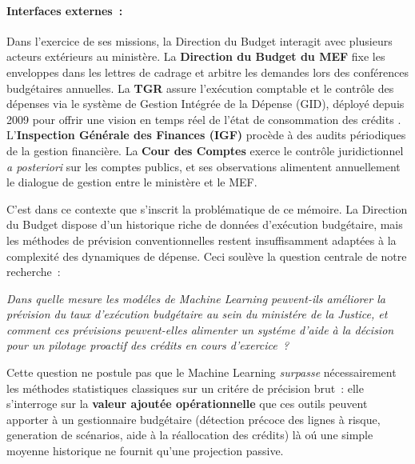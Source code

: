 \paragraph{Interfaces externes~:}

Dans l'exercice de ses missions, la Direction du Budget interagit avec plusieurs acteurs ext\'erieurs au minist\`ere. La \textbf{Direction du Budget du MEF} fixe les enveloppes dans les lettres de cadrage et arbitre les demandes lors des conf\'erences budg\'etaires annuelles. La \textbf{TGR} assure l'ex\'ecution comptable et le contr\^ole des d\'epenses via le syst\`eme de Gestion Int\'egr\'ee de la D\'epense (GID), d\'eploy\'e depuis 2009 pour offrir une vision en temps r\'eel de l'\'etat de consommation des cr\'edits \citep{ElMoussali2023}. L'\textbf{Inspection G\'en\'erale des Finances (IGF)} proc\`ede \`a des audits p\'eriodiques de la gestion financi\`ere. La \textbf{Cour des Comptes} exerce le contr\^ole juridictionnel \textit{a posteriori} sur les comptes publics, et ses observations alimentent annuellement le dialogue de gestion entre le minist\`ere et le MEF.

C'est dans ce contexte que s'inscrit la probl\'ematique de ce m\'emoire. La Direction du Budget dispose d'un historique riche de donn\'ees d'ex\'ecution budg\'etaire, mais les m\'ethodes de pr\'evision conventionnelles restent insuffisamment adapt\'ees \`a la complexit\'e des dynamiques de d\'epense. Ceci soul\`eve la question centrale de notre recherche~:

\begin{center}
\textit{Dans quelle mesure les mod\'eles de Machine Learning peuvent-ils am\'eliorer
la pr\'evision du taux d'ex\'ecution budg\'etaire au sein du minist\'ere de la Justice,
et comment ces pr\'evisions peuvent-elles alimenter un syst\'eme d'aide \`a la d\'ecision
pour un pilotage proactif des cr\'edits en cours d'exercice~?}
\end{center}

Cette question ne postule pas que le Machine Learning \textit{surpasse} n\'ecessairement
les m\'ethodes statistiques classiques sur un crit\'ere de pr\'ecision brut~: elle
s'interroge sur la \textbf{valeur ajout\'ee op\'erationnelle} que ces outils peuvent
apporter \`a un gestionnaire budg\'etaire (d\'etection pr\'ecoce des lignes \`a risque,
generation de sc\'enarios, aide \`a la r\'eallocation des cr\'edits) l\`a o\'u une
simple moyenne historique ne fournit qu'une projection passive.

